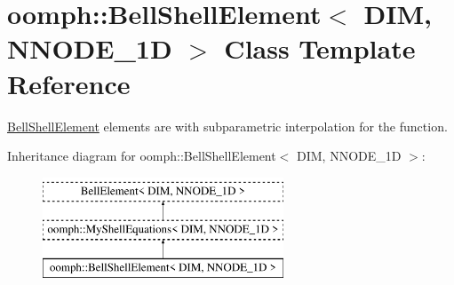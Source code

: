 \hypertarget{classoomph_1_1BellShellElement}{}\section{oomph\+:\+:Bell\+Shell\+Element$<$ D\+IM, N\+N\+O\+D\+E\+\_\+1D $>$ Class Template Reference}
\label{classoomph_1_1BellShellElement}


\hyperlink{classoomph_1_1BellShellElement}{Bell\+Shell\+Element} elements are with subparametric interpolation for the function.  


Inheritance diagram for oomph\+:\+:Bell\+Shell\+Element$<$ D\+IM, N\+N\+O\+D\+E\+\_\+1D $>$\+:\begin{figure}[H]
\begin{center}
\leavevmode
\includegraphics[height=3.000000cm]{classoomph_1_1BellShellElement}
\end{center}
\end{figure}
